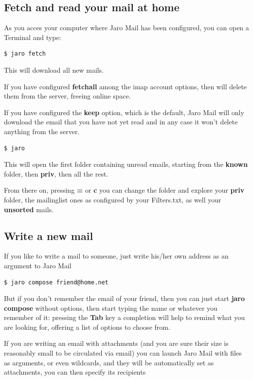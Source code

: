 \documentclass[a4,onecolumn,portrait]{article}
\begin{document}
\subsection{Fetch and read your mail at home}
\label{sec-6-1}

As you acces your computer where Jaro Mail has been configured, you
can open a Terminal and type:

\begin{verbatim}
$ jaro fetch
\end{verbatim}

This will download all new mails.

If you have configured \textbf{fetchall} among the imap account options, then
will delete them from the server, freeing online space.

If you have configured the \textbf{keep} option, which is the default, Jaro
Mail will only download the email that you have not yet read and in
any case it won't delete anything from the server.

\begin{verbatim}
$ jaro
\end{verbatim}

This will open the first folder containing unread emails, starting from
the \textbf{known} folder, then \textbf{priv}, then all the rest.

From there on, pressing \textbf{=} or \textbf{c} you can change the folder and
explore your \textbf{priv} folder, the mailinglist ones as configured by your
Filters.txt, as well your \textbf{unsorted} mails.
\subsection{Write a new mail}
\label{sec-6-2}

If you like to write a mail to someone, just write his/her own address
as an argument to Jaro Mail

\begin{verbatim}
$ jaro compose friend@home.net
\end{verbatim}

But if you don't remember the email of your friend, then you can just
start \textbf{jaro compose} without options, then start typing the
name or whatever you remember of it: pressing the \textbf{Tab} key a
completion will help to remind what you are looking for, offering a
list of options to choose from.

If you are writing an email with attachments (and you are sure their
size is reasonably small to be circulated via email) you can launch
Jaro Mail with files as arguments, or even wildcards, and they will be
automatically set as attachments, you can then specify its recipients
\end{document}

